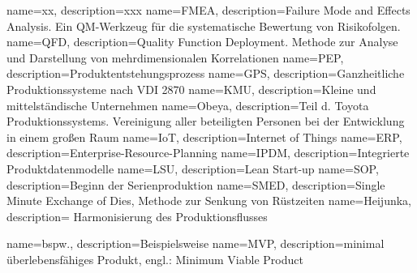 %
{
  name=xx, 
  description={xxx}
}
%
%
{
  name=FMEA, 
  description={Failure Mode and Effects Analysis. Ein QM-Werkzeug für die systematische Bewertung von Risikofolgen.}
}
%
%
{
  name=QFD, 
  description={Quality Function Deployment. Methode zur Analyse und Darstellung von mehrdimensionalen Korrelationen}
}
%
%
{
  name=PEP, 
  description={Produktentstehungsprozess}
}
%
%
{
  name=GPS, 
  description={Ganzheitliche Produktionssysteme nach VDI 2870}
}
%
%
{
  name=KMU, 
  description={Kleine und mittelständische Unternehmen}
}
%
%
{
  name=Obeya, 
  description={Teil d. Toyota Produktionssystems. Vereinigung aller beteiligten Personen bei der Entwicklung in einem großen Raum}
}
%
{
  name=IoT, 
  description={Internet of Things}
}
%
%
{
  name=ERP, 
  description={Enterprise-Resource-Planning}
}
%
{
  name=IPDM, 
  description={Integrierte Produktdatenmodelle}
}
%
{
  name=LSU, 
  description={Lean Start-up}
}
%
{
  name=SOP, 
  description={Beginn der Serienproduktion}
}
%
{
  name=SMED, 
  description={Single Minute Exchange of Dies, Methode zur Senkung von Rüstzeiten}
}
%
{
  name=Heijunka, 
  description={
Harmonisierung des Produktionsflusses}
}

{
  name=bspw.,
  description={Beispielsweise}
}
%
{  
  name=MVP,
  description={minimal überlebensfähiges Produkt, engl.: Minimum Viable
Product}
}
